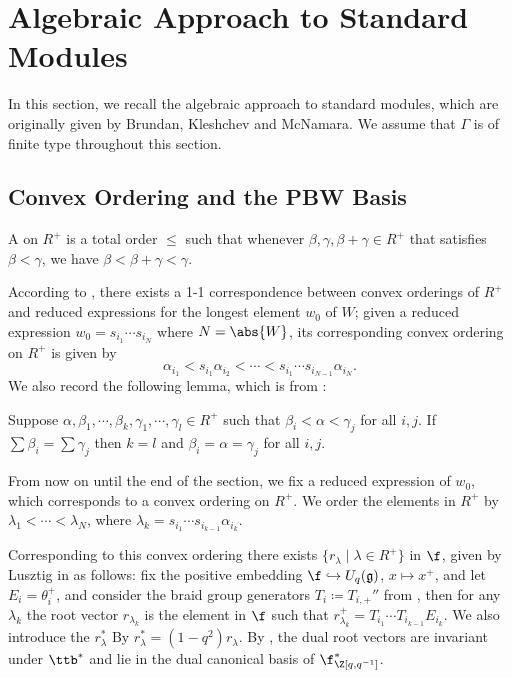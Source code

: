 \section{Algebraic Approach to Standard Modules}

In this section, we recall the algebraic approach to standard modules,
which are originally given by Brundan, Kleshchev and McNamara.
We assume that $\Gamma$ is of finite type throughout this section.

\subsection{Convex Ordering and the PBW Basis}

A  on $R^+$ is a total order $\le$ such that
whenever $\beta,\gamma,\beta+\gamma\in R^+$ that satisfies
$\beta<\gamma$, we have $\beta<\beta+\gamma<\gamma$.

According to \cite{P}, there exists a 1-1 correspondence between convex orderings
of $R^+$ and reduced expressions for the longest element $w_0$ of $W$;
given a reduced expression $w_0 = s_{i_1}\cdots s_{i_N}$ where $N = \abs{W}$,
its corresponding convex ordering on $R^+$ is given by
\[
    \alpha_{i_1}<s_{i_1}\alpha_{i_2}<\cdots<s_{i_1}\cdots s_{i_{N-1}}\alpha_{i_N}.
\]    
We also record the following lemma, which is from \cite[Lemma 2.4]{BKM}:

\begin{lemma}\label{sum-in-convex-ordering}
    Suppose $\alpha,\beta_1,\cdots,\beta_k,\gamma_1,\cdots,\gamma_l\in R^+$
    such that $\beta_i<\alpha<\gamma_j$ for all $i,j$. If $\sum\beta_i = \sum\gamma_j$
    then $k = l$ and $\beta_i = \alpha = \gamma_j$ for all $i,j$.
\end{lemma}

From now on until the end of the section, we fix a reduced expression of $w_0$,
which corresponds to a convex ordering on $R^+$. We order the elements in $R^+$
by $\lambda_1<\cdots<\lambda_N$, where 
$\lambda_k = s_{i_1}\cdots s_{i_{k-1}}\alpha_{i_k}$. 

Corresponding to this convex ordering
there exists  $\{r_\lambda\mid\lambda\in R^+\}$ in $\f$,
given by Lusztig in \cite{L} as follows: fix the positive embedding 
$\f\hookrightarrow U_q(\mathfrak{g})$, $x\mapsto x^+$, and let $E_i = \theta_i^+$,
and consider the braid group generators $T_i \coloneq  T_{i,+}''$ from 
\cite[37.1.3]{L}, then for any $\lambda_k$ the root vector $r_{\lambda_k}$
is the element in $\f$ such that $r_{\lambda_k}^+ = T_{i_1}\cdots T_{i_{k-1}}
E_{i_k}$. We also introduce the  $r^*_\lambda$ By
$r^*_\lambda = (1-q^2)r_\lambda$. By \cite[37.2.4]{L}, the dual root vectors
are invariant under $\ttb^*$ and lie in the dual canonical basis of 
$\f^*_{\Z[q,q^{-1}]}$. 

